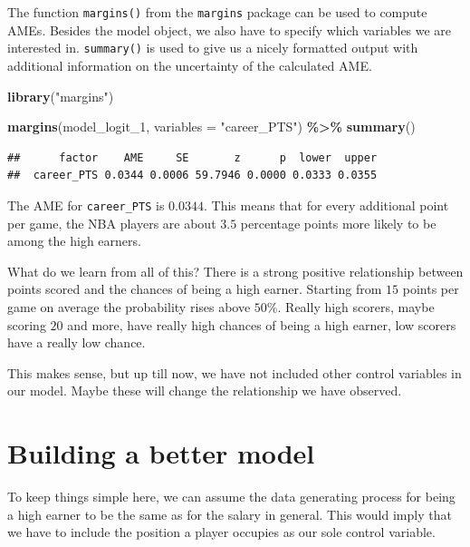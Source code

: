 \documentclass[
]{book}
\newenvironment{Shaded}{\begin{snugshade}}{\end{snugshade}}
\newcommand{\AttributeTok}[1]{\textcolor[rgb]{0.13,0.29,0.53}{#1}}
\newcommand{\FunctionTok}[1]{\textcolor[rgb]{0.13,0.29,0.53}{\textbf{#1}}}
\newcommand{\NormalTok}[1]{#1}
\newcommand{\SpecialCharTok}[1]{\textcolor[rgb]{0.81,0.36,0.00}{\textbf{#1}}}
\newcommand{\StringTok}[1]{\textcolor[rgb]{0.31,0.60,0.02}{#1}}
\begin{document}
The function \texttt{margins()} from the \texttt{margins} package can be used to compute AMEs.
Besides the model object, we also have to specify which variables we are
interested in. \texttt{summary()} is used to give us a nicely formatted output with
additional information on the uncertainty of the calculated AME.

\begin{Shaded}
\begin{Highlighting}[]
\FunctionTok{library}\NormalTok{(}\StringTok{"margins"}\NormalTok{)}

\FunctionTok{margins}\NormalTok{(model\_logit\_1, }\AttributeTok{variables =} \StringTok{"career\_PTS"}\NormalTok{) }\SpecialCharTok{\%\textgreater{}\%} 
  \FunctionTok{summary}\NormalTok{()}
\end{Highlighting}
\end{Shaded}

\begin{verbatim}
##      factor    AME     SE       z      p  lower  upper
##  career_PTS 0.0344 0.0006 59.7946 0.0000 0.0333 0.0355
\end{verbatim}

The AME for \texttt{career\_PTS} is \(0.0344\). This means that for every
additional point per game, the NBA players are about \(3.5\) percentage
points more likely to be among the high earners.

What do we learn from all of this? There is a strong positive
relationship between points scored and the chances of being a high
earner. Starting from \(15\) points per game on average the probability
rises above \(50\%\). Really high scorers, maybe scoring \(20\) and more,
have really high chances of being a high earner, low scorers have a
really low chance.

This makes sense, but up till now, we have not included other control
variables in our model. Maybe these will change the relationship we have
observed.

\hypertarget{building-a-better-model}{%
\section{Building a better model}\label{building-a-better-model}}

To keep things simple here, we can assume the data generating process
for being a high earner to be the same as for the salary in general.
This would imply that we have to include the position a player occupies
as our sole control variable.
\end{document}
